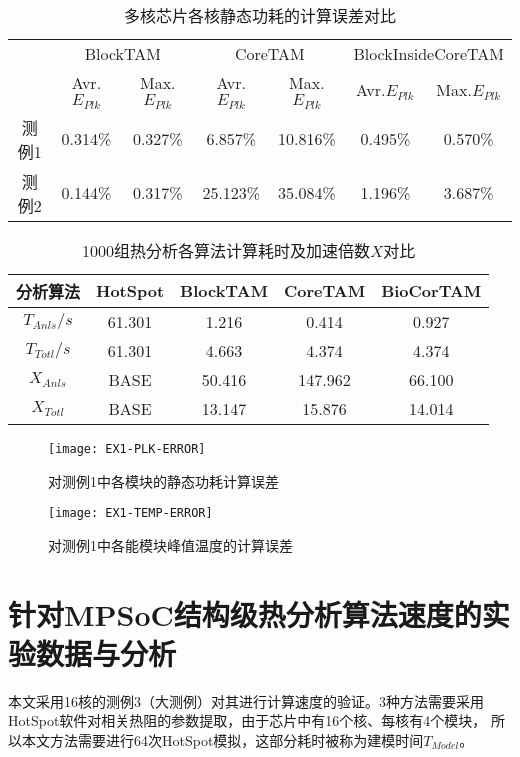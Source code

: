 \begin{table}
\centering
\caption{多核芯片各核静态功耗的计算误差对比}
\begin{tabular}{c c c c c c c}
\hline\hline
 & \multicolumn{2}{c}{BlockTAM} & \multicolumn{2}{c}{CoreTAM} & \multicolumn{2}{c}{BlockInsideCoreTAM} \\
 & Avr.$E_{Plk}$ & Max.$E_{Plk}$ & Avr.$E_{Plk}$ & Max.$E_{Plk}$ & Avr.$E_{Plk}$ & Max.$E_{Plk}$ \\
\hline
测例1 & 0.314\% & 0.327\% & 6.857\% & 10.816\% & 0.495\% & 0.570\% \\
\hline
测例2 & 0.144\% & 0.317\% & 25.123\% & 35.084\% & 1.196\% & 3.687\% \\
\hline
\end{tabular}
\label{tab:chap5:power-leakage-error}
\end{table}

\begin{table}
\centering
\caption{1000组热分析各算法计算耗时及加速倍数$X$对比}
\begin{tabular}{c c c c c}
\hline\hline
分析算法 & HotSpot & BlockTAM & CoreTAM & BioCorTAM \\ [0.5ex]
\hline
$T_{Anls}/s$ & 61.301 & 1.216 & 0.414 & 0.927 \\
\hline
$T_{Totl}/s$ & 61.301 & 4.663 & 4.374 & 4.374 \\
\hline
$X_{Anls}$ & BASE & 50.416 & 147.962 & 66.100 \\
\hline
$X_{Totl}$ & BASE & 13.147 & 15.876 & 14.014 \\
\hline
\end{tabular}
\label{tab:chap5:time-speedup}
\end{table}

\begin{figure}[H]
  \centering
  \texttt{[image: EX1-PLK-ERROR]}
  \caption{对测例1中各模块的静态功耗计算误差}
  \label{fig:ex1-plk-error}
\end{figure}
\begin{figure}[H]
  \centering
  \texttt{[image: EX1-TEMP-ERROR]}
  \caption{对测例1中各能模块峰值温度的计算误差}
  \label{fig:ex1-temp-error}
\end{figure}


\section{针对MPSoC结构级热分析算法速度的实验数据与分析}
\label{exp-speedup}
本文采用16核的测例3（大测例）对其进行计算速度的验证。3种方法需要采用HotSpot软件对相关热阻的参数提取，由于芯片中有16个核、每核有4个模块， 所以本文方法需要进行64次HotSpot模拟，这部分耗时被称为建模时间$T_{Model}$。

